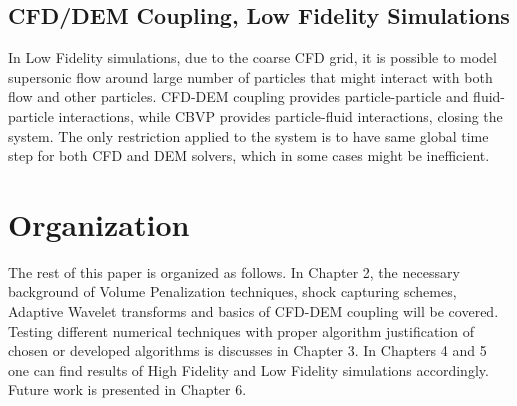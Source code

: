\subsection{CFD/DEM Coupling, Low Fidelity Simulations}
In Low Fidelity simulations, due to the coarse CFD grid, it is possible to model supersonic flow around large number of particles that might interact with both flow and other particles. CFD-DEM coupling provides particle-particle and fluid-particle interactions, while CBVP provides particle-fluid interactions, closing the system. The only restriction applied to the system is to have same global time step for both CFD and DEM solvers, which in some cases might be inefficient. 


\section{Organization}
The rest of this paper is organized as follows. In Chapter 2, the necessary background of Volume Penalization techniques, shock capturing schemes, Adaptive Wavelet transforms and basics of CFD-DEM coupling will be covered. Testing different numerical techniques with proper algorithm justification of chosen or developed algorithms is discusses in Chapter 3. In Chapters 4 and 5 one can find results of High Fidelity and Low Fidelity simulations accordingly. Future work is presented in Chapter 6.
